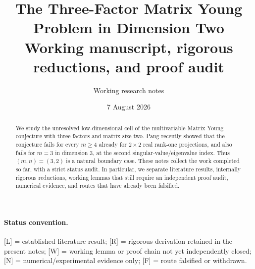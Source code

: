 \documentclass[11pt]{article}
\title{The Three-Factor Matrix Young Problem in Dimension Two\\
\large Working manuscript, rigorous reductions, and proof audit}
\author{Working research notes}
\date{7 August 2026}
\theoremstyle{definition}
\newcommand{\statusL}{\textcolor{blue!70!black}{[L]}}
\newcommand{\statusR}{\textcolor{green!50!black}{[R]}}
\newcommand{\statusW}{\textcolor{orange!80!black}{[W]}}
\newcommand{\statusN}{\textcolor{purple!70!black}{[N]}}
\newcommand{\statusF}{\textcolor{red!70!black}{[F]}}
\begin{document}
\maketitle

\begin{abstract}
We study the unresolved low-dimensional cell of the multivariable Matrix Young conjecture with three factors and matrix size two.  Pang recently showed that the conjecture fails for every $m\ge4$ already for $2\times2$ real rank-one projections, and also fails for $m=3$ in dimension $3$, at the second singular-value/eigenvalue index.  Thus $(m,n)=(3,2)$ is a natural boundary case.  These notes collect the work completed so far, with a strict status audit.  In particular, we separate literature results, internally rigorous reductions, working lemmas that still require an independent proof audit, numerical evidence, and routes that have already been falsified.
\end{abstract}

\paragraph{Status convention.}
\statusL{} = established literature result; \statusR{} = rigorous derivation retained in the present notes; \statusW{} = working lemma or proof chain not yet independently closed; \statusN{} = numerical/experimental evidence only; \statusF{} = route falsified or withdrawn.

\tableofcontents











\end{document}
